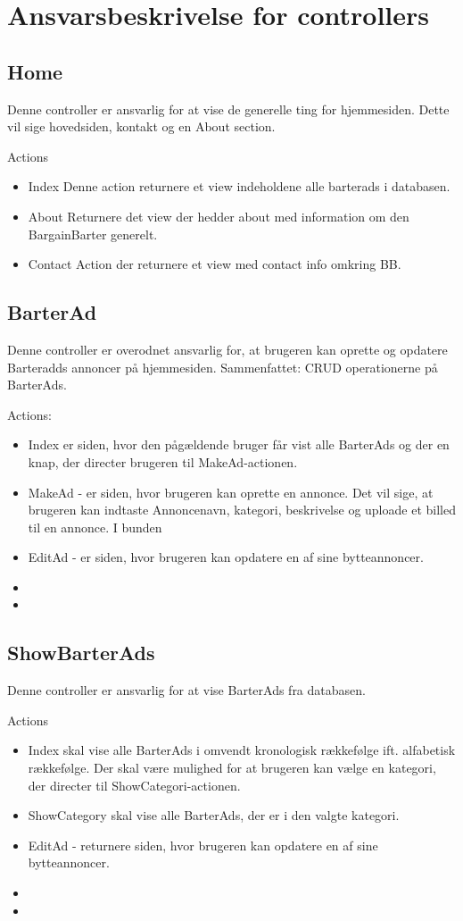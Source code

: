 \section{Ansvarsbeskrivelse for controllers}

\subsection{Home}
Denne controller er ansvarlig for at vise de generelle ting for hjemmesiden. Dette vil sige hovedsiden, kontakt og en About section.  

Actions
\begin{itemize}
	\item Index
	Denne action returnere et view indeholdene alle barterads i databasen. 
	\item About
	Returnere det view der hedder about med information om den BargainBarter generelt.
	\item Contact
	Action der returnere et view med contact info omkring BB.
\end{itemize}


\subsection{BarterAd}
Denne controller er overodnet ansvarlig for, at brugeren kan oprette og opdatere Barteradds annoncer på hjemmesiden. Sammenfattet: CRUD operationerne på BarterAds.

Actions:
\begin{itemize}
	\item Index er siden, hvor den pågældende bruger får vist alle BarterAds og der en knap, der directer brugeren til MakeAd-actionen.
	\item MakeAd - er siden, hvor brugeren kan oprette en annonce. Det vil sige, at brugeren kan indtaste Annoncenavn, kategori, beskrivelse og uploade et billed til en annonce. I bunden
	\item EditAd - er siden, hvor brugeren kan opdatere en af sine bytteannoncer.
	\item 
	\item
\end{itemize}

\subsection{ShowBarterAds}
Denne controller er ansvarlig for at vise BarterAds fra databasen.

Actions 
\begin{itemize}
	\item Index skal vise alle BarterAds i omvendt kronologisk rækkefølge ift. alfabetisk rækkefølge. Der skal være mulighed for at brugeren kan vælge en kategori, der directer til ShowCategori-actionen.
	\item ShowCategory skal vise alle BarterAds, der er i den valgte kategori.
	\item EditAd - returnere siden, hvor brugeren kan opdatere en af sine bytteannoncer.
	\item 
	\item
\end{itemize}


